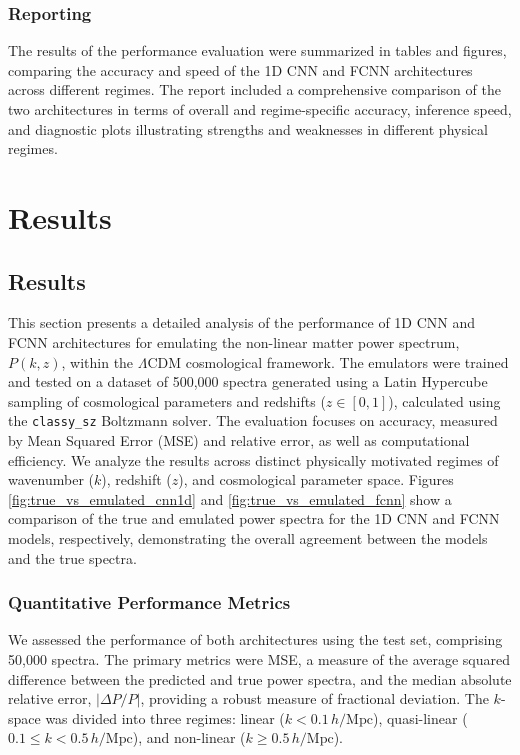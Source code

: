 \documentclass[twocolumn]{aastex631}
\begin{document}
\subsubsection{Reporting}

The results of the performance evaluation were summarized in tables and figures, comparing the accuracy and speed of the 1D CNN and FCNN architectures across different regimes. The report included a comprehensive comparison of the two architectures in terms of overall and regime-specific accuracy, inference speed, and diagnostic plots illustrating strengths and weaknesses in different physical regimes.

\section{Results}
\label{sec:results}
\subsection{Results}

This section presents a detailed analysis of the performance of 1D CNN and FCNN architectures for emulating the non-linear matter power spectrum, $P(k, z)$, within the $\Lambda$CDM cosmological framework. The emulators were trained and tested on a dataset of 500,000 spectra generated using a Latin Hypercube sampling of cosmological parameters and redshifts ($z \in [0, 1]$), calculated using the \texttt{classy\_sz} Boltzmann solver. The evaluation focuses on accuracy, measured by Mean Squared Error (MSE) and relative error, as well as computational efficiency. We analyze the results across distinct physically motivated regimes of wavenumber ($k$), redshift ($z$), and cosmological parameter space. Figures \ref{fig:true_vs_emulated_cnn1d} and \ref{fig:true_vs_emulated_fcnn} show a comparison of the true and emulated power spectra for the 1D CNN and FCNN models, respectively, demonstrating the overall agreement between the models and the true spectra.

\subsubsection{Quantitative Performance Metrics}

We assessed the performance of both architectures using the test set, comprising 50,000 spectra. The primary metrics were MSE, a measure of the average squared difference between the predicted and true power spectra, and the median absolute relative error, $|\Delta P/P|$, providing a robust measure of fractional deviation. The $k$-space was divided into three regimes: linear ($k < 0.1\,h/\mathrm{Mpc}$), quasi-linear ($0.1 \leq k < 0.5\,h/\mathrm{Mpc}$), and non-linear ($k \geq 0.5\,h/\mathrm{Mpc}$).
\end{document}
